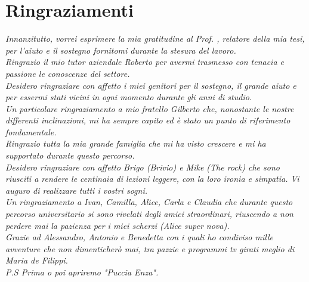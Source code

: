 \cleardoublepage
{}
{}

\begingroup
\let\clearpage\relax
\let\cleardoublepage\relax
\let\cleardoublepage\relax

\chapter*{Ringraziamenti}

\noindent \textit{Innanzitutto, vorrei esprimere la mia gratitudine al Prof. \myProf, relatore della mia tesi, per l'aiuto e il sostegno fornitomi durante la stesura del lavoro.}\\

\noindent \textit{Ringrazio il mio tutor aziendale Roberto per avermi trasmesso con tenacia e passione le conoscenze del settore.}\\

\noindent \textit{Desidero ringraziare con affetto i miei genitori per il sostegno, il grande aiuto e per essermi stati vicini in ogni momento durante gli anni di studio.}\\

\noindent \textit{Un particolare ringraziamento a mio fratello Gilberto che, nonostante le nostre differenti inclinazioni, mi ha sempre capito ed è stato un punto di riferimento fondamentale.}\\

\noindent \textit{Ringrazio tutta la mia grande famiglia che mi ha visto crescere e mi ha supportato durante questo percorso.}\\

\noindent \textit{Desidero ringraziare con affetto Brigo (Brivio) e Mike (The rock) che sono riusciti a rendere le centinaia di lezioni leggere, con la loro ironia e simpatia. Vi auguro di realizzare tutti i vostri sogni.}\\

\noindent \textit{Un ringraziamento a Ivan, Camilla, Alice, Carla e Claudia che durante questo percorso universitario si sono rivelati degli amici straordinari, riuscendo a non perdere mai la pazienza per i miei scherzi (Alice super nova).}\\

\noindent \textit{Grazie ad Alessandro, Antonio e Benedetta con i quali ho condiviso mille avventure che non dimenticherò mai, tra pazzie e programmi tv girati meglio di Maria de Filippi.\\
P.S Prima o poi apriremo "Puccia Enza". }\\

